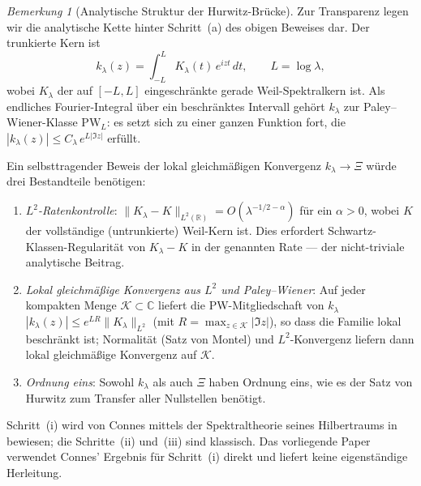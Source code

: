 \documentclass[11pt,a4paper]{article}
\theoremstyle{remark}
\newtheorem{remark}[remark]{Bemerkung}
\theoremstyle{plain}
\begin{document}
\begin{remark}[Analytische Struktur der Hurwitz-Brücke]
\label{rem:hurwitz-analytical}
Zur Transparenz legen wir die analytische Kette hinter Schritt~(a) des obigen Beweises dar.
Der trunkierte Kern ist
\[
  k_\lambda(z)
  = \int_{-L}^{L} K_\lambda(t)\,e^{izt}\,dt, \qquad L = \log\lambda,
\]
wobei $K_\lambda$ der auf $[-L,L]$ eingeschränkte gerade Weil-Spektralkern ist.
Als endliches Fourier-Integral über ein beschränktes Intervall gehört $k_\lambda$
zur Paley--Wiener-Klasse $\mathrm{PW}_L$: es setzt sich zu einer ganzen Funktion
fort, die $|k_\lambda(z)|\leq C_\lambda\,e^{L|\Im z|}$ erfüllt.

Ein selbsttragender Beweis der lokal gleichmäßigen Konvergenz $k_\lambda\to\Xi$
würde drei Bestandteile benötigen:
\begin{enumerate}[label=(\roman*),leftmargin=*]
  \item \emph{$L^2$-Ratenkontrolle}: $\|K_\lambda - K\|_{L^2(\mathbb{R})}
    = O(\lambda^{-1/2-\alpha})$ für ein $\alpha>0$,
    wobei $K$ der vollständige (untrunkierte) Weil-Kern ist.
    Dies erfordert Schwartz-Klassen-Regularität von $K_\lambda - K$
    in der genannten Rate --- der nicht-triviale analytische Beitrag.
  \item \emph{Lokal gleichmäßige Konvergenz aus $L^2$ und Paley--Wiener}:
    Auf jeder kompakten Menge $\mathcal{K}\subset\mathbb{C}$ liefert
    die PW-Mitgliedschaft von $k_\lambda$
    $|k_\lambda(z)|\leq e^{LR}\|K_\lambda\|_{L^2}$
    (mit $R = \max_{z\in\mathcal{K}}|\Im z|$), so dass die Familie lokal beschränkt
    ist; Normalität (Satz von Montel) und $L^2$-Konvergenz liefern dann lokal
    gleichmäßige Konvergenz auf $\mathcal{K}$.
  \item \emph{Ordnung eins}: Sowohl $k_\lambda$ als auch $\Xi$ haben Ordnung eins,
    wie es der Satz von Hurwitz zum Transfer aller Nullstellen benötigt.
\end{enumerate}
Schritt~(i) wird von Connes mittels der Spektraltheorie seines Hilbertraums in
\cite[Fact~6.4 und Abschnitte~6.4--6.6]{Connes2026} bewiesen;
die Schritte~(ii) und~(iii) sind klassisch.
Das vorliegende Paper verwendet Connes' Ergebnis für Schritt~(i) direkt und
liefert keine eigenständige Herleitung.
\end{remark}
\end{document}
